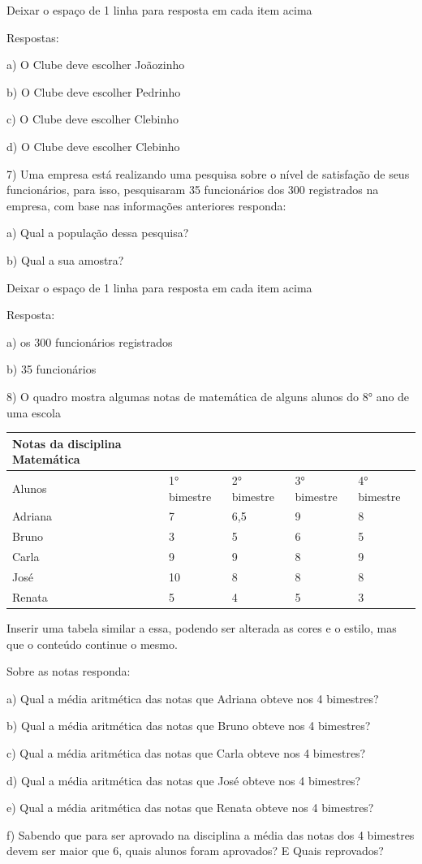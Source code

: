 Deixar o espaço de 1 linha para resposta em cada item acima

Respostas:

a) O Clube deve escolher Joãozinho

b) O Clube deve escolher Pedrinho

c) O Clube deve escolher Clebinho

d) O Clube deve escolher Clebinho

7) Uma empresa está realizando uma pesquisa sobre o nível de satisfação
de seus funcionários, para isso, pesquisaram 35 funcionários dos 300
registrados na empresa, com base nas informações anteriores responda:

a) Qual a população dessa pesquisa?

b) Qual a sua amostra?

Deixar o espaço de 1 linha para resposta em cada item acima

Resposta:

a) os 300 funcionários registrados

b) 35 funcionários

8) O quadro mostra algumas notas de matemática de alguns alunos do 8°
ano de uma escola

\begin{longtable}[]{@{}lllll@{}}
\toprule
Notas da disciplina Matemática & & & &\tabularnewline
\midrule
\endhead
Alunos & 1° bimestre & 2° bimestre & 3° bimestre & 4°
bimestre\tabularnewline
Adriana & 7 & 6,5 & 9 & 8\tabularnewline
Bruno & 3 & 5 & 6 & 5\tabularnewline
Carla & 9 & 9 & 8 & 9\tabularnewline
José & 10 & 8 & 8 & 8\tabularnewline
Renata & 5 & 4 & 5 & 3\tabularnewline
\bottomrule
\end{longtable}

Inserir uma tabela similar a essa, podendo ser alterada as cores e o
estilo, mas que o conteúdo continue o mesmo.

Sobre as notas responda:

a) Qual a média aritmética das notas que Adriana obteve nos 4 bimestres?

b) Qual a média aritmética das notas que Bruno obteve nos 4 bimestres?

c) Qual a média aritmética das notas que Carla obteve nos 4 bimestres?

d) Qual a média aritmética das notas que José obteve nos 4 bimestres?

e) Qual a média aritmética das notas que Renata obteve nos 4 bimestres?

f) Sabendo que para ser aprovado na disciplina a média das notas dos 4
bimestres devem ser maior que 6, quais alunos foram aprovados? E Quais
reprovados?

